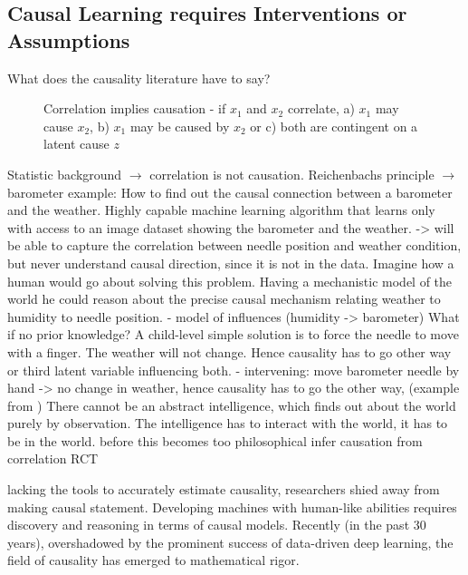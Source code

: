 	\subsection{Causal Learning requires Interventions or Assumptions}
	What does the causality literature have to say?
	\begin{figure}[t]
		\begin{subfigure}{0.3\linewidth}
			\centering
			
			\caption{}
		\end{subfigure}
		\begin{subfigure}{0.3\linewidth}
			\centering
			
			\caption{}
		\end{subfigure}
		\begin{subfigure}{0.3\linewidth}
			\centering
			
			\caption{}
		\end{subfigure}
		\caption{Correlation implies causation - if $x_1$ and $x_2$ correlate, a) $x_1$ may cause $x_2$,  b) $x_1$ may be caused by $x_2$ or c) both are contingent on a latent cause $z$}
		\label{fig:reichenbach}
	\end{figure}
	Statistic background $\rightarrow$ correlation is not causation.
	Reichenbachs principle \cite{reichenbach56time}
	$\rightarrow$ barometer example: How to find out the causal connection between a barometer and the weather. Highly capable machine learning algorithm that learns only with access to an image dataset showing the barometer and the weather. -> will be able to capture the correlation between needle position and weather condition, but never understand causal direction, since it is not in the data.
	Imagine how a human would go about solving this problem. Having a mechanistic model of the world he could reason about the precise causal mechanism relating weather to humidity to needle position.
	- model of influences (humidity -> barometer)
	What if no prior knowledge? A child-level simple solution is to force the needle to move with a finger. The weather will not change. Hence causality has to go other way or third latent variable influencing both.
	- intervening: move barometer needle by hand -> no change in weather, hence causality has to go the other way, (example from \cite{pearl18why})
	There cannot be an abstract intelligence, which finds out about the world purely by observation. The intelligence has to interact with the world, it has to be in the world.
	before this becomes too philosophical
	infer causation from correlation
	RCT

	lacking the tools to accurately estimate causality, researchers shied away from making causal statement. Developing machines with human-like abilities requires discovery and reasoning in terms of causal models. Recently (in the past 30 years), overshadowed by the prominent success of data-driven deep learning, the field of causality has emerged to mathematical rigor.

